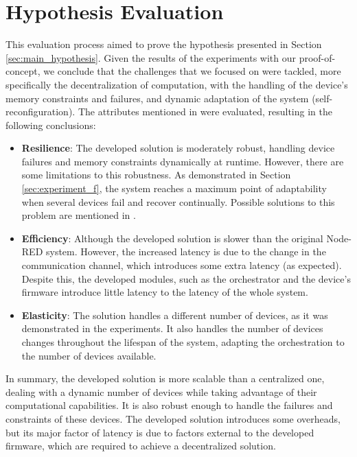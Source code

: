 \section{Hypothesis Evaluation}\label{sec:evaluation_hypothesis}

This evaluation process aimed to prove the hypothesis presented in Section \ref{sec:main_hypothesis}. Given the results of the experiments with our proof-of-concept, we conclude that the challenges that we focused on were tackled, more specifically the decentralization of computation, with the handling of the device's memory constraints and failures, and dynamic adaptation of the system (self-reconfiguration). The attributes mentioned in  were evaluated, resulting in the following conclusions:

\begin{itemize}
    \item \textbf{Resilience}: The developed solution is moderately robust, handling device failures and memory constraints dynamically at runtime. However, there are some limitations to this robustness. As demonstrated in Section \ref{sec:experiment_f}, the system reaches a maximum point of adaptability when several devices fail and recover continually. Possible solutions to this problem are mentioned in .
    \item \textbf{Efficiency}: Although the developed solution is slower than the original Node-RED system. However, the increased latency is due to the change in the communication channel, which introduces some extra latency (as expected). Despite this, the developed modules, such as the orchestrator and the device's firmware introduce little latency to the latency of the whole system.
    \item \textbf{Elasticity}: The solution handles a different number of devices, as it was demonstrated in the experiments. It also handles the number of devices changes throughout the lifespan of the system, adapting the orchestration to the number of devices available.
\end{itemize}

In summary, the developed solution is more scalable than a centralized one, dealing with a dynamic number of devices while taking advantage of their computational capabilities. It is also robust enough to handle the failures and constraints of these devices. The developed solution introduces some overheads, but its major factor of latency is due to factors external to the developed firmware, which are required to achieve a decentralized solution.

